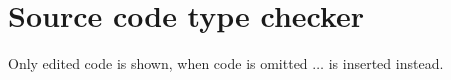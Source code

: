 \documentclass[10pt]{article}
\begin{document}
\newpage

\nocite{springer2011}
\nocite{slideInterpretation}
\nocite{slideSyntaxAnalysis}
\nocite{slideTypeChecking}
\nocite{slideMachineCodeGeneration}
\nocite{slideMachineCodeGenerationFunction}
\nocite{slideRegAlloc}
\nocite{slideLexicalAnalysis}
\nocite{MoscowML}
\nocite{Mars}
\nocite{MipsModule}
\nocite{PattersonHennessy}

\renewcommand{\refname}{\section{References}}


\newpage
\appendix
\section{Source code type checker}
Only edited code is shown, when code is omitted $\ldots$ is inserted instead.
\end{document}
